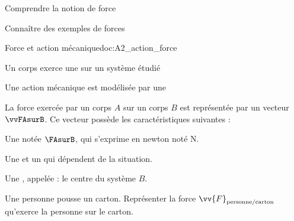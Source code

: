 \teteSndMouv


\vspace*{-32pt}


\begin{objectifs}
  \item Comprendre la notion de force
  \item Connaître des exemples de forces
\end{objectifs}

\begin{doc}{Force et action mécanique}{doc:A2_action_force}
  \begin{encart}  
    Un corps exerce une  sur un système étudié 
  \end{encart}
  
  Une action mécanique est modélisée par une 

  \begin{encart}
    La force exercée par un corps $A$ sur un corps $B$ est représentée par un vecteur $\vvFAsurB$.
    Ce vecteur possède les caractéristiques suivantes :
    \begin{listePoints}
      \item Une  notée $\FAsurB$, qui s'exprime en newton noté \unit{\newton}.
      \item Une  et un  qui dépendent de la situation.
      \item Une , appelée  : le centre du système $B$.
    \end{listePoints}
  \end{encart}
\end{doc}

\mesure
Une personne pousse un carton. 
Représenter la force $\vv{F}_\text{personne/carton}$ qu'exerce la personne sur le carton.

\vspace*{-8pt}
\begin{center}
\end{center}



